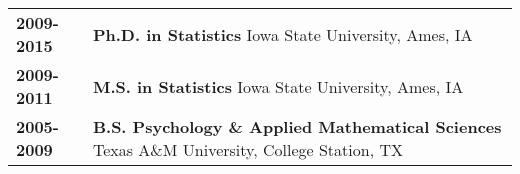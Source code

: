 
\newcommand{\EducationEntry}[4]{
  \textbf{\large \textcolor{materialRedDark}{#1-}}\textbf{\large\textcolor{materialRed}{#2}}\hspace{20pt} & \textbf{\large #3} \hfill{\normalsize \textcolor{textLightGray}{#4}}\vspace{5pt}\\
}


\begin{tabularx}{.95\textwidth}{l X}
\EducationEntry{2009}{2015}{Ph.D. in Statistics}{Iowa State University, Ames, IA}
\EducationEntry{2009}{2011}{M.S. in Statistics}{Iowa State University, Ames, IA}
\EducationEntry{2005}{2009}{B.S. Psychology \& Applied Mathematical Sciences}{Texas A\&M University, College Station, TX}
\end{tabularx}
